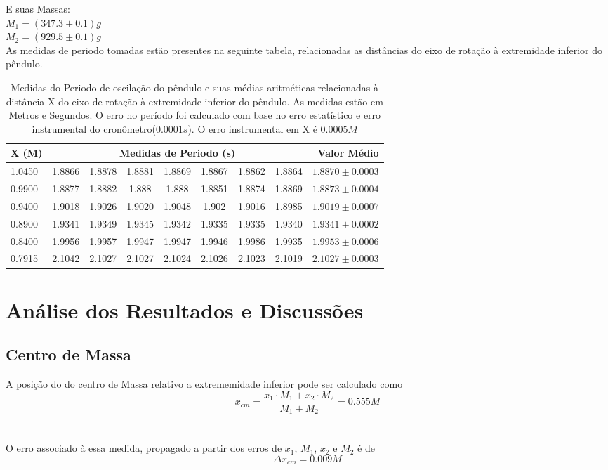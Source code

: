 \documentclass[12pt,a4paper]{article}
\begin{document}
E suas Massas:\\
$ M_1 = (347.3 \pm 0.1) g $\\
$ M_2 = (929.5 \pm 0.1) g $\\


As medidas de periodo tomadas estão presentes na seguinte tabela, relacionadas as distâncias do eixo de rotação à extremidade inferior do pêndulo. \\

\begin{table}[!htbp]
\def\arraystretch{1.5}
\begin{tabular}{|l| c c c c c c c|r|}
\hline 
X (M) & \multicolumn{7}{c|}{Medidas de Periodo (s)} & Valor Médio \\ 
\hline
1.0450 & 1.8866 & 1.8878 & 1.8881 & 1.8869 & 1.8867 & 1.8862 & 1.8864 & $1.8870 \pm 0.0003 $ \\
\hline
0.9900 & 1.8877 & 1.8882 & 1.888 & 1.888 & 1.8851 & 1.8874 & 1.8869 & $1.8873 \pm 0.0004 $\\
\hline
0.9400 & 1.9018 & 1.9026 & 1.9020 & 1.9048 & 1.902 & 1.9016 & 1.8985 & $1.9019 \pm 0.0007$\\
\hline
0.8900 & 1.9341 & 1.9349 & 1.9345 & 1.9342 & 1.9335 & 1.9335 & 1.9340 & $1.9341 \pm 0.0002$\\
\hline
0.8400 & 1.9956 & 1.9957 & 1.9947 & 1.9947 & 1.9946 & 1.9986 & 1.9935 & $1.9953 \pm 0.0006$\\
\hline
0.7915 & 2.1042 & 2.1027 & 2.1027 & 2.1024 & 2.1026 & 2.1023 & 2.1019 & $2.1027 \pm 0.0003 $\\
\hline
 
\end{tabular}
\caption{Medidas do Periodo de oscilação do pêndulo e suas médias aritméticas relacionadas à distância X do eixo de rotação à extremidade inferior do pêndulo. As medidas estão em Metros e Segundos. O erro no período foi calculado com base no erro estatístico e erro instrumental do cronômetro($0.0001 s$). O erro instrumental em X é $0.0005M$}
\end{table}


\newpage

\section{Análise dos Resultados e Discussões}
\subsection{Centro de Massa}
A posição do do centro de Massa relativo a extrememidade inferior pode ser calculado como\\
$$ x_{cm} = \frac{x_1 \cdot M_1 + x_2 \cdot M_2}{M_1 + M_2} = 0.555 M $$\\ \\
O erro associado à essa medida, propagado a partir dos erros de $x_1$, $M_1$, $x_2$ e $M_2$ é de $$ \Delta x_{cm} =  0.009 M $$
\end{document}
